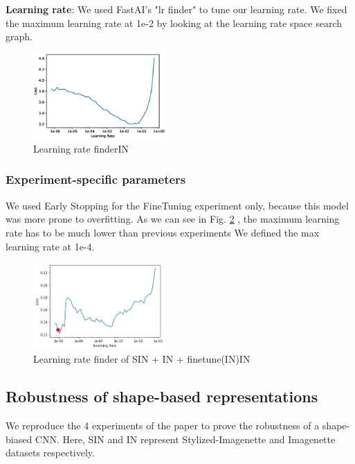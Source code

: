 \documentclass{article}
\begin{document}
\textbf{Learning rate}: We used FastAI's "lr finder" to tune our learning rate.
We fixed the maximum learning rate at 1e-2 by looking at the learning rate space search graph.
\begin{figure}[h!]
  \includegraphics[width = 0.45\textwidth]{imgs/lr_find.eps}
  \caption{Learning rate finder\texorpdfstring{\textrightarrow} .IN}
  \label{loss_in}
\end{figure}

\subsubsection{Experiment-specific parameters}
We used Early Stopping for the FineTuning experiment only, because this model was more prone to overfitting.
As we can see in Fig. \ref{lr_finetune} , the maximum learning rate has to be much lower than previous experiments 
We defined the max learning rate at 1e-4.

\begin{figure}[h!]
  \includegraphics[width = 0.45\textwidth]{imgs/lr_finetune.png}
  \caption{Learning rate finder of SIN + IN + finetune(IN)\texorpdfstring{\textrightarrow} .IN}
  \label{lr_finetune}
\end{figure}


\subsection{Robustness of shape-based representations}

We reproduce the 4 experiments of the paper to prove the robustness of a shape-biased CNN.
Here, SIN and IN represent Stylized-Imagenette and Imagenette datasets respectively.
\end{document}
